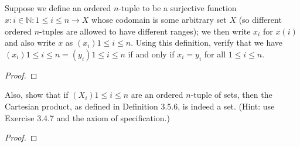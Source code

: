 \documentclass[../../main.tex]{subfiles}
\begin{document}

\addtocounter{subsection}{1}
\subsection{}
\begin{q}
    Suppose we define an ordered $n$-tuple to be a surjective function $x : {i \in \mathbb{N} : 1 \leq i \leq n} \to X$ whose codomain is some arbitrary set $X$ (so different ordered $n$-tuples are allowed to have different ranges); we then write $x_i$ for $x(i)$ and also write $x$ as $(x_i){1 \leq i \leq n}$. Using this definition, verify that we have $(x_i){1 \leq i \leq n} = (y_i){1 \leq i \leq n}$ if and only if $x_i = y_i$ for all $1 \leq i \leq n$. 
\end{q}

\begin{proof}

\end{proof}
\begin{xx}
    
\end{xx}

\begin{q}
    Also, show that if $(X_i){1 \leq i \leq n}$ are an ordered $n$-tuple of sets, then the Cartesian product, as defined in Definition 3.5.6, is indeed a set. (Hint: use Exercise 3.4.7 and the axiom of specification.)
\end{q}

\begin{proof}

\end{proof}
\begin{xx}
    
\end{xx}

\addtocounter{subsection}{1}
\end{document}
